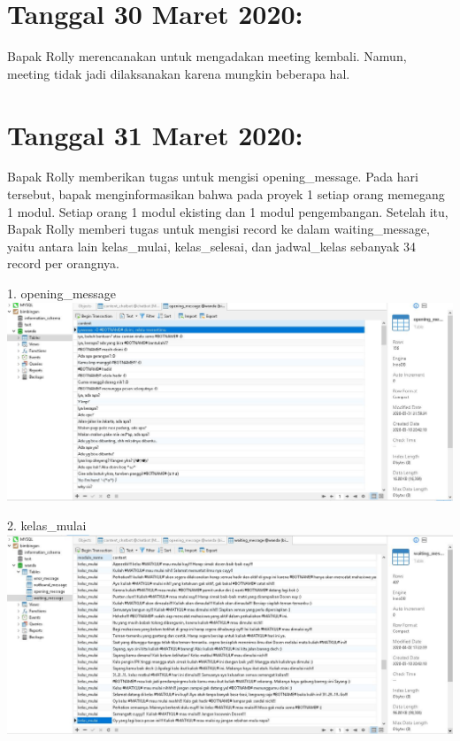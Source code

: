 \documentclass{article}
\begin{document}
\section{Tanggal 30 Maret 2020:}
Bapak Rolly merencanakan untuk mengadakan meeting kembali. Namun, meeting tidak jadi dilaksanakan karena mungkin beberapa hal. 


\section{Tanggal 31 Maret 2020:}
Bapak Rolly memberikan tugas untuk mengisi opening_message. Pada hari tersebut, bapak menginformasikan bahwa pada proyek 1 setiap orang memegang 1 modul. Setiap orang 1 modul ekisting dan 1 modul pengembangan. Setelah itu, Bapak Rolly memberi tugas untuk mengisi record ke dalam waiting_message, yaitu antara lain kelas_mulai, kelas_selesai, dan jadwal_kelas sebanyak 34 record per orangnya.
    \newline
    \newline
        \item 1. opening\_message
            \newline
            \includegraphics[scale=0.3]{31.1.jpg}
            \newline
        \item 2. kelas\_mulai
            \newline
            \includegraphics[scale=0.3]{31.2.jpg}
\end{document}
